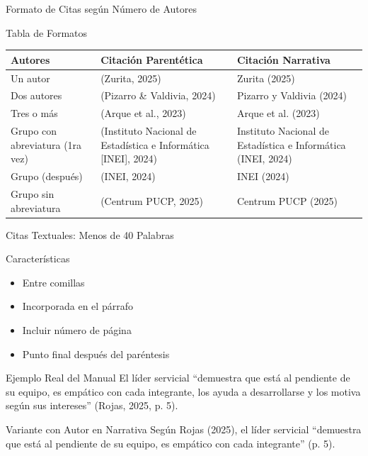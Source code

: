 \documentclass[spanish,aspectratio=169]{beamer}
\begin{document}
\begin{frame}{Formato de Citas según Número de Autores}
	\small
	\begin{block}{Tabla de Formatos}
	\begin{tabular}{p{3.5cm} l l}  %
		\toprule
		\textbf{Autores} & \textbf{Citación Parentética} & \textbf{Citación Narrativa} \\
		\midrule
		Un autor & (Zurita, 2025) & Zurita (2025) \\
		\midrule
		Dos autores & (Pizarro \& Valdivia, 2024) & Pizarro y Valdivia (2024) \\
		\midrule
		Tres o más & (Arque et al., 2023) & Arque et al. (2023) \\
		\midrule
		Grupo con abreviatura (1ra vez) & (Instituto Nacional de Estadística e Informática [INEI], 2024) & Instituto Nacional de Estadística e Informática (INEI, 2024) \\
		\midrule
		Grupo (después) & (INEI, 2024) & INEI (2024) \\
		\midrule
		Grupo sin abreviatura & (Centrum PUCP, 2025) & Centrum PUCP (2025) \\
		\bottomrule
	\end{tabular}
	\end{block}
\end{frame}

\begin{frame}{Citas Textuales: Menos de 40 Palabras}
	\begin{block}{Características}
		\begin{itemize}
			\item Entre comillas
			\item Incorporada en el párrafo
			\item Incluir número de página
			\item Punto final \alert{después} del paréntesis
		\end{itemize}
	\end{block}
	
	\begin{exampleblock}{Ejemplo Real del Manual}
		\small
		El líder servicial ``demuestra que está al pendiente de su equipo, es empático con cada integrante, los ayuda a desarrollarse y los motiva según sus intereses'' (Rojas, 2025, p. 5).
	\end{exampleblock}
	
	\begin{alertblock}{Variante con Autor en Narrativa}
		\small
		Según Rojas (2025), el líder servicial ``demuestra que está al pendiente de su equipo, es empático con cada integrante'' (p. 5).
	\end{alertblock}
\end{frame}
\end{document}
